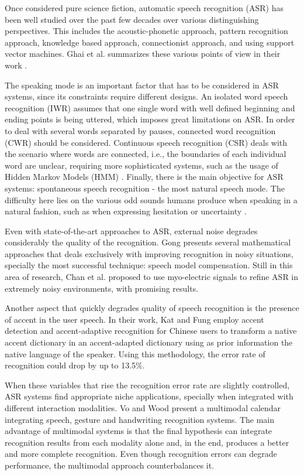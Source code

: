 \documentclass[]{article}
\begin{document}
Once considered pure science fiction, automatic speech recognition (ASR) has been well studied over the past few decades
over various distinguishing perspectives. This includes the acoustic-phonetic approach, pattern recognition approach, knowledge
based approach, connectionist approach, and using support vector machines. Ghai et al. summarizes these various points of view
in their work \cite{GhaiSingh}.


The speaking mode is an important factor that has to be considered in ASR systems, since its constraints require
different designs. An isolated word speech recognition (IWR) assumes that one single word with well defined beginning
and ending points is being uttered, which imposes great limitations on ASR. In order to deal with several words
separated by pauses, connected word recognition (CWR) should be considered. Continuous speech recognition (CSR) deals
with the scenario where words are connected, i.e., the boundaries of each individual word are unclear, requiring more
sophisticated systems, such as the usage of Hidden Markov Models (HMM) \cite{Young2001}. Finally, there is the main
objective for ASR systems: spontaneous speech recognition - the most natural speech mode. The difficulty here lies on
the various odd sounds humans produce when speaking in a natural fashion, such as when expressing hesitation or
uncertainty \cite{GhaiSingh}.


Even with state-of-the-art approaches to ASR, external noise degrades considerably the quality of the recognition. Gong
\cite{Gong1995261} presents several mathematical approaches that deals exclusively with improving recognition in noisy
situations, specially the most successful technique: speech model compensation. Still in this area of research, Chan et
al. \cite{Chan2001} proposed to use myo-electric signals to refine ASR in extremely noisy environments, with promising
results.


Another aspect that quickly degrades quality of speech recognition is the presence of accent in the user speech. In their work,
Kat and Fung \cite{KatFung758102} employ accent detection and accent-adaptive recognition for Chinese users to transform a native
accent dictionary in an accent-adapted dictionary using as prior information the native language of the speaker. Using this
methodology, the error rate of recognition could drop by up to 13.5\%.


When these variables that rise the recognition error rate are slightly controlled, ASR systems find appropriate niche
applications, specially when integrated with different interaction modalities. Vo and Wood \cite{VoWood550794} present a
multimodal calendar integrating speech, gesture and handwriting recognition systems. The main advantage of multimodal
systems is that the final hypothesis can integrate recognition results from each modality alone and, in the end,
produces a better and more complete recognition. Even though recognition errors can degrade performance, the multimodal
approach counterbalances it.
\end{document}
